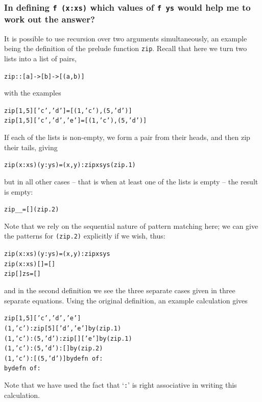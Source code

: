 \subsubsection*{In defining {\tt f (x:xs)} which values
of {\tt f ys} would help me to work out the answer?}

\begin{example}
It is possible to use recursion over two arguments simultaneously, 
an example being the definition of the prelude function \texttt{zip}.
Recall that here we turn two lists into a list of pairs,
\begin{alltt}
zip :: [a] -> [b] -> [(a,b)]
\end{alltt}
with the examples
\begin{alltt}
zip [1,5] ['c','d']     = [(1,'c'), (5,'d')]
zip [1,5] ['c','d','e'] = [(1,'c'), (5,'d')]
\end{alltt}
If each of the lists is non-empty, we form a pair from their heads,
and then zip their tails, giving
\begin{alltt}
zip (x:xs) (y:ys) = (x,y) : zip xs ys\hfill(zip.1)
\end{alltt}
but in all other cases -- that is when at least one of the lists is empty -- 
the result is empty:
\begin{alltt}
zip _ _ = []\hfill(zip.2)
\end{alltt}
Note that we rely on the sequential nature of pattern matching
here; we can give the patterns
for \texttt{(zip.2)} explicitly if we wish, thus:
\begin{alltt}
zip (x:xs) (y:ys) = (x,y) : zip xs ys
zip (x:xs) []     = []
zip []     zs     = []
\end{alltt}
and in the second definition we see the three separate cases given in
three separate equations. Using the original definition, an example
calculation gives
\begin{alltt}
zip [1,5] ['c','d','e']
\step (1,'c') : zip [5] ['d','e']\hfill\textrm{by }(zip.1)
\step (1,'c') : (5,'d') : zip [] ['e']\hfill\textrm{by }(zip.1)
\step (1,'c') : (5,'d') : []\hfill\textrm{by }(zip.2)
\step (1,'c') : [ (5,'d') ]\hfill\textrm{by defn\ of} :
\step [ (1,'c') , (5,'d') ]\hfill\textrm{by defn\ of} :
\end{alltt}
Note that we have used the fact that `\texttt{:}' is right
associative in writing this calculation.


\end{example}
